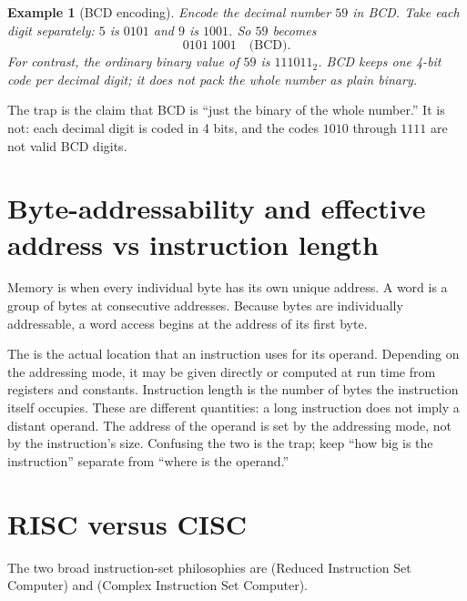 \documentclass[11pt]{article}
\newtheorem{example}{Example}[section]
\begin{document}
\begin{example}[BCD encoding]
Encode the decimal number $59$ in BCD. Take each digit separately: $5$ is
$0101$ and $9$ is $1001$. So $59$ becomes
\[
0101\ 1001 \quad\text{(BCD)}.
\]
For contrast, the ordinary binary value of $59$ is $111011_2$. BCD keeps one
4-bit code per decimal digit; it does not pack the whole number as plain
binary.
\end{example}

The trap is the claim that BCD is ``just the binary of the whole number.''
It is not: each decimal digit is coded in 4 bits, and the codes $1010$ through
$1111$ are not valid BCD digits.

\section{Byte-addressability and effective address vs instruction length}
Memory is  when every individual byte has its own unique
address. A word is a group of bytes at consecutive addresses. Because bytes
are individually addressable, a word access begins at the address of its
first byte.

The  is the actual location that an instruction uses
for its operand. Depending on the addressing mode, it may be given directly
or computed at run time from registers and constants. Instruction length is
the number of bytes the instruction itself occupies. These are different
quantities: a long instruction does not imply a distant operand. The address
of the operand is set by the addressing mode, not by the instruction's size.
Confusing the two is the trap; keep ``how big is the instruction'' separate
from ``where is the operand.''

\section{RISC versus CISC}
The two broad instruction-set philosophies are  (Reduced Instruction
Set Computer) and  (Complex Instruction Set Computer).
\end{document}
